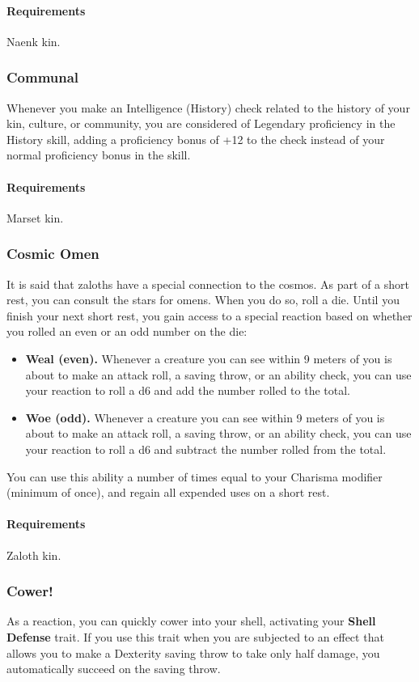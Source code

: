    \paragraph{Requirements} Naenk kin.
\subsubsection{Communal} \label{feat::communal}
    Whenever you make an Intelligence (History) check related to the history of your kin, culture, or community, you are considered of Legendary proficiency in the History skill, adding a proficiency bonus of +12 to the check instead of your normal proficiency bonus in the skill.
    \paragraph{Requirements} Marset kin.
\subsubsection{Cosmic Omen} \label{feat::cosmicomen}
    It is said that zaloths have a special connection to the cosmos.
    As part of a short rest, you can consult the stars for omens.
    When you do so, roll a die.
    Until you finish your next short rest, you gain access to a special reaction based on whether you rolled an even or an odd number on the die:
    \begin{itemize}
        \item \textbf{Weal (even).} Whenever a creature you can see within 9 meters of you is about to make an attack roll, a saving throw, or an ability check, you can use your reaction to roll a d6 and add the number rolled to the total.
        \item \textbf{Woe (odd).} Whenever a creature you can see within 9 meters of you is about to make an attack roll, a saving throw, or an ability check, you can use your reaction to roll a d6 and subtract the number rolled from the total.
    \end{itemize}
    You can use this ability a number of times equal to your Charisma modifier (minimum of once), and regain all expended uses on a short rest.
    \paragraph{Requirements} Zaloth kin.
\subsubsection{Cower!} \label{feat::cower}
    As a reaction, you can quickly cower into your shell, activating your \textbf{Shell Defense} trait.
    If you use this trait when you are subjected to an effect that allows you to make a Dexterity saving throw to take only half damage, you automatically succeed on the saving throw.

